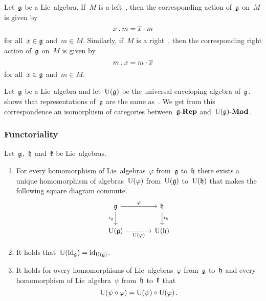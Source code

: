 \begin{fluff}
	Let~$\mathfrak{g}$ be a Lie~algebra.
	If~$M$ is a left~\module{$\Univ(\glie)$}, then the corresponding action of~$\mathfrak{g}$ on~$M$ is given by
	\[
		x \mathbin{.} m
		=
		\overline{x} \cdot m
	\]
	for all~$x \in \mathfrak{g}$ and~$m \in M$.
	Similarly, if~$M$ is a right~\module{$\Univ(\glie)$}, then the corresponding right action of~$\mathfrak{g}$ on~$M$ is given by
	\[
		m \mathbin{.} x
		=
		m \cdot \overline{x}
	\]
	for all~$x \in \mathfrak{g}$ and~$m \in M$.
\end{fluff}

\begin{remark}
	Let~$\mathfrak{g}$ be a Lie~algebra and let~$\Univ(\glie)$ be the universal enveloping algebra of~$\mathfrak{g}$.
	 shows that representations of~$\mathfrak{g}$ are the same as~{\modules{$\Univ(\glie)$}}.
	We get from this correspondence an isomorphism of categories between~$\mathfrak{g}\text{-}\mathbf{Rep}$ and~$\operatorname{U}(\mathfrak{g})\text{-}\mathbf{Mod}$.
\end{remark}

\subsubsection{Functoriality}

\begin{proposition}
	\label{functoriality of universal enveloping algebra}
	Let~$\mathfrak{g}$,~$\mathfrak{h}$ and~$\mathfrak{k}$ be Lie~algebras.
	\begin{enumerate}
		\item
			For every homomorphism of Lie~algebras~$\varphi$ from~$\mathfrak{g}$ to~$\mathfrak{h}$ there exists a unique homomorphism of algebras~$\operatorname{U}(\varphi)$ from~$\Univ(\glie)$ to~$\operatorname{U}(\mathfrak{h})$ that makes the following square diagram commute.
			\[
				\begin{tikzcd}[column sep = large]
					\glie
					\arrow{r}[above]{\varphi}
					\arrow{d}[left]{\iota_{\glie}}
					&
					\hlie
					\arrow{d}[right]{\iota_{\hlie}}
					\\
					\Univ(\glie)
					\arrow[dashed]{r}[below]{\Univ(\varphi)}
					&
					\Univ(\hlie)
				\end{tikzcd}
			\]
		\item
			It holds that~$\operatorname{U}(\mathrm{id}_{\mathfrak{g}}) = \mathrm{id}_{\operatorname{U}(\mathfrak{g})}$.
		\item
			It holds for overy homomorphisms of Lie~algebras~$\varphi$ from~$\mathfrak{g}$ to~$\mathfrak{h}$ and every homomorphism of Lie~algebra~$\psi$ from~$\mathfrak{h}$ to~$\mathfrak{k}$ that
			\[
				\operatorname{U}( \psi \circ \varphi )
				=
				\operatorname{U}( \psi ) \circ \operatorname{U}( \varphi ) \,.
			\]
	\end{enumerate}
\end{proposition}


